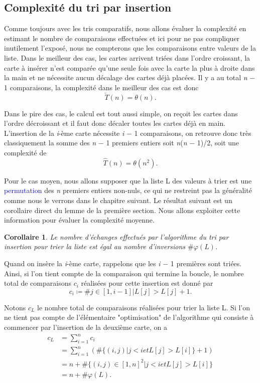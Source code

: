 \documentclass[a4paper,10pt]{article}
\newtheorem{corollaire}[theoreme]{Corollaire}
\begin{document}
\subsection{Complexité du tri par insertion}
Comme toujours avec les tris comparatifs, nous allons évaluer la complexité en estimant le nombre de comparaisons 
effectuées et ici pour ne pas compliquer inutilement l'exposé, nous ne compterons que les comparaisons entre valeurs 
de la liste. Dans le meilleur des cas, les cartes arrivent triées dans l'ordre croissant, la carte à insérer n'est 
comparée qu'une seule fois avec la carte la plus à droite dans la main et ne nécessite aucun décalage des cartes 
déjà placées. Il y a au total {\itshape n} $-$ 1 comparaisons, la complexité dans le meilleur des cas est donc
\[ \check{T}(n) = \theta(n). \]

Dans le pire des cas, le calcul est tout aussi simple, on reçoit les cartes dans l'ordre décroissant et il faut 
donc décaler toutes les cartes déjà en main. L'insertion de la {\itshape i}-ème carte nécessite {\itshape i} $-$ 1
com­pa­rai­sons, on retrouve donc très classiquement la somme des {\itshape n} $-$ 1 premiers entiers soit 
{\itshape n}({\itshape n} $-$ 1)/2, soit une complexité de \[ \hat{T}(n) = \theta(n^2). \]

Pour le cas moyen, nous allons supposer que la liste L des valeurs à trier est une \textcolor{blue}{permutation} 
des {\itshape n} premiers entiers non-nuls, ce qui ne restreint pas la généralité comme nous le verrons dans 
le cha­pi­tre suivant. Le résultat suivant est un corollaire direct du lemme de la première section. 
Nous allons exploiter cette information pour évaluer la complexité moyenne.

\begin{corollaire}
    Le nombre d'échanges effectués par l'algorithme du tri par insertion pour trier la liste 
    est égal au nombre d'inversions $\#\varphi(L)$.
\end{corollaire}

Quand on insère la {\itshape i}-ème carte, rappelons que les {\itshape i} $-$ 1 premières sont triées. 
Ainsi, si l'on tient compte de la comparaison qui termine la boucle, le nombre total de comparaisons $c_i$ réalisées 
pour cette insertion est donné par \[ c_i \coloneqq \#j \in [1, i-1] | L[j] > L[j] + 1. \]

Notons $c_L$ le nombre total de comparaisons réalisées pour trier la liste L. Si l'on ne tient pas compte de 
l'élé­men­tai­re "op­ti­mi­sa­tion" de l'algorithme qui consiste à commencer par l'insertion de la deu­xième carte, on a
\begin{align*}
    c_L & = \sum_{i=1}^{n} c_i \\
        & = \sum_{i=1}^{n}(\#\{(i,j) | j < i et L[j] > L[i]\} + 1) \\
        & = n + \#\{(i,j) \in [1,n]^2 | j < i et L[j] > L[i]\} \\
        & = n + \#\varphi(L). \\
\end{align*}
\end{document}
